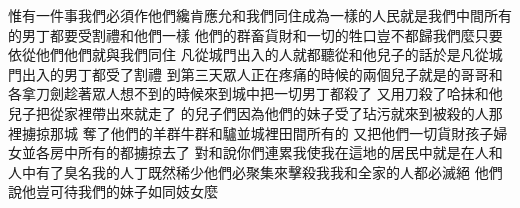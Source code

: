 惟有一件事我們必須作\chientien 他們纔肯應允\chientien 和我們同住\chientien 成為一樣的人民\chientien 就是我們中間所有的男丁\chientien 都要受割禮\chientien 和他們一樣\chuan 
{}他們的群畜\chientien 貨財\chientien 和一切的牲口\chientien 豈不都歸我們麼\yuentien 只要依從他們\chientien 他們就與我們同住\chuan 
{}凡從城門出入的人\chientien 就都聽從和他兒子的話\chientien 於是凡從城門出入的男丁\chientien 都受了割禮\chuan 
{}到第三天\chientien 眾人正在疼痛的時候\chientien{}的兩個兒子\chientien 就是的哥哥\chientien{}和\chientien 各拿刀劍\chientien 趁著眾人想不到的時候\chientien 來到城中\chientien 把一切男丁都殺了\chuan 
{}又用刀殺了哈抹和他兒子\chientien 把從家裡帶出來\chientien 就走了\chuan 
{}的兒子們因為他們的妹子受了玷污\chientien 就來到被殺的人那裡\chientien 擄掠那城\chientien 
{}奪了他們的羊群\chientien 牛群\chientien 和驢\chientien 並城裡田間所有的\yuentien 
{}又把他們一切貨財\chientien 孩子\chientien 婦女\chientien 並各房中所有的\chientien 都擄掠去了\chuan 
{}對和說\chientien 你們連累我\chientien 使我在這地的居民中\chientien 就是在人\chientien 和人中\chientien 有了臭名\chientien 我的人丁既然稀少\chientien 他們必聚集來擊殺我\chientien 我和全家的人\chientien 都必滅絕\chuan 
{}他們說\chientien 他豈可待我們的妹子如同妓女麼\chuan 
